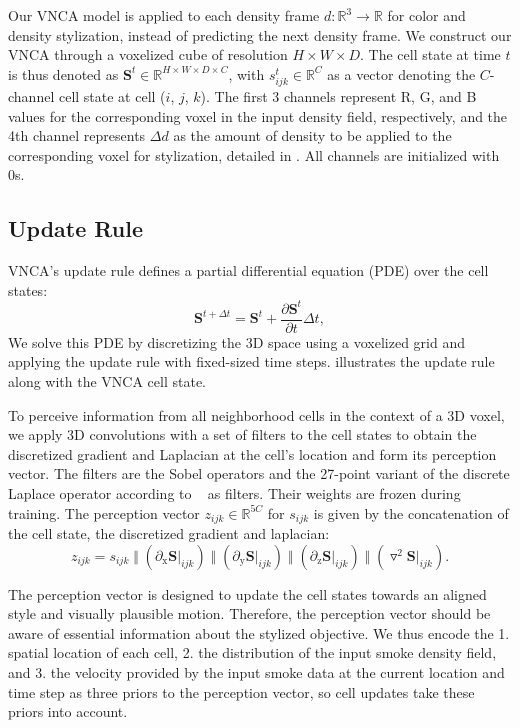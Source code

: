 Our VNCA model is applied to each density frame $d: \mathbb{R}^3 \rightarrow \mathbb{R}$ for color and density stylization, instead of predicting the next density frame. 
We construct our VNCA through a voxelized cube of resolution $H\times W\times D$. 
The cell state at time $t$ is thus denoted as $\mathbf{S}^t \in \mathbb{R}^{H\times W\times D \times C}$, with $s^t_{ijk} \in \mathbb{R}^C$ as a vector denoting the $C$-channel cell state at cell ($i$, $j$, $k$).
The first 3 channels represent R, G, and B values for the corresponding voxel in the input density field, respectively, and the 4th channel represents $\Delta d$ as the amount of density to be applied to the corresponding voxel for stylization, detailed in .
All channels are initialized with 0s.

\subsection{Update Rule}
\label{sec:update}
VNCA's update rule defines a partial differential equation (PDE) over the cell states:
\begin{equation}
    \mathbf{S}^{t+\Delta t} = \mathbf{S}^t + \frac{\partial \mathbf{S}^t}{\partial t}\Delta t,
\end{equation}
We solve this PDE by discretizing the 3D space using a voxelized grid and applying the update rule with fixed-sized time steps.  illustrates the update rule along with the VNCA cell state. 


\medskip
{}
To perceive information from all neighborhood cells in the context of a 3D voxel, we apply 3D convolutions with a set of filters to the cell states to obtain the discretized gradient and Laplacian at the cell's location and form its perception vector. 
The filters are the Sobel operators and the 27-point variant of the discrete Laplace operator according to ~\citet{o2006family} as filters. 
Their weights are frozen during training. 
The perception vector $z_{ijk} \in \mathbb{R}^{5C}$ for $s_{ijk}$ is given by the concatenation of the cell state, the discretized gradient and laplacian: 
\begin{equation}
    z_{ijk} = s_{ijk} \;\Vert \; (\partial_\text{x}\mathbf{S}|_{ijk}) \; \Vert \;(\partial_\text{y}\mathbf{S}|_{ijk})\; \Vert \;(\partial_\text{z}\mathbf{S}|_{ijk})\;\Vert \;(\triangledown^2\mathbf{S}|_{ijk}). 
\end{equation}

\medskip
{}
The perception vector is designed to update the cell states towards an aligned style and visually plausible motion. 
Therefore, the perception vector should be aware of essential information about the stylized objective.
We thus encode the 1. spatial location of each cell, 2. the distribution of the input smoke density field, and 3. the velocity provided by the input smoke data at the current location and time step as three priors to the perception vector, so cell updates take these priors into account. 

